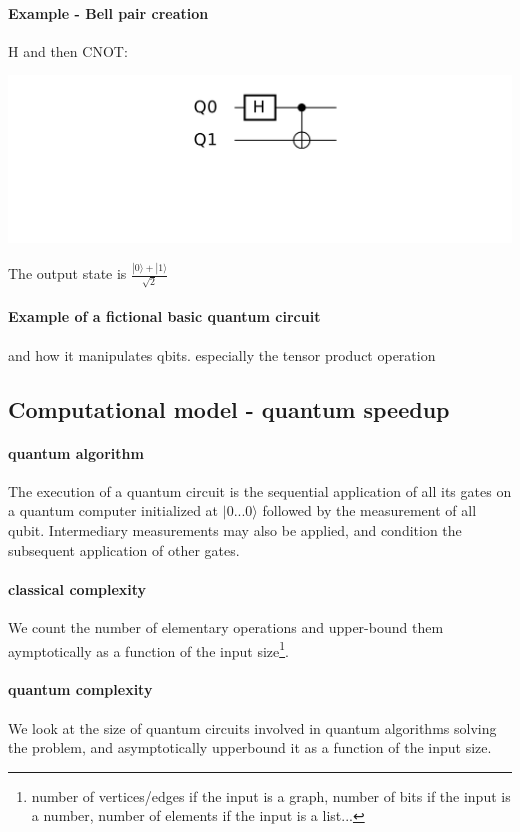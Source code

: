 \documentclass{article}
\begin{document}
\paragraph{Example - Bell pair creation} H and then CNOT:
\begin{center}
    \includegraphics[width=\textwidth]{bell_pair_creation.pdf}
\end{center}
The output state is $\frac{|0\rangle+|1\rangle}{\sqrt{2}}$

\paragraph{Example of a fictional basic quantum circuit} and how it manipulates
qbits. especially the tensor product operation

\subsection{Computational model - quantum speedup}

\paragraph{quantum algorithm} The execution of a quantum circuit is the
sequential application of all its gates on a quantum computer
initialized at $|0...0\rangle$ followed by the measurement of all qubit.
Intermediary measurements may also be applied, and condition the subsequent application
of other gates. 

\paragraph{classical complexity}
We count the number of elementary operations and upper-bound them aymptotically 
as a function of the input size\footnote{number of vertices/edges if the input is a graph, 
number of bits if the input is a number, number of elements if the input is a list...}.

\paragraph{quantum complexity} We look at the size of quantum circuits involved in
quantum algorithms solving the problem, and asymptotically upperbound it as a function
of the input size.
\end{document}
